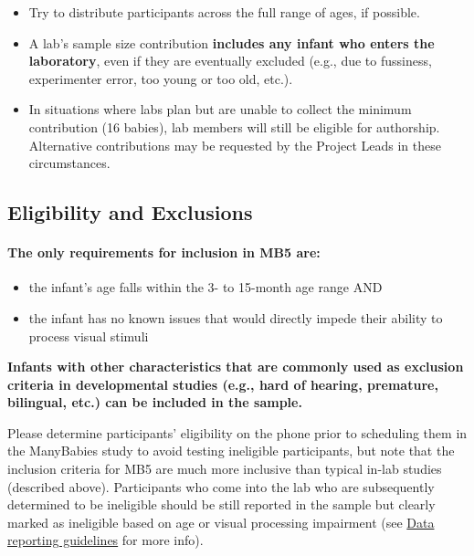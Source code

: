 \documentclass[
]{book}
\providecommand{\tightlist}{%
  \setlength{\itemsep}{0pt}\setlength{\parskip}{0pt}}
\begin{document}
\begin{itemize}
\tightlist
\item
  Try to distribute participants across the full range of ages, if possible.
\item
  A lab's sample size contribution \textbf{includes any infant who enters the laboratory}, even if they are eventually excluded (e.g., due to fussiness, experimenter error, too young or too old, etc.).
\item
  In situations where labs plan but are unable to collect the minimum contribution (16 babies), lab members will still be eligible for authorship. Alternative contributions may be requested by the Project Leads in these circumstances.
\end{itemize}

\subsection{Eligibility and Exclusions}\label{eligibility-and-exclusions}

\paragraph*{\texorpdfstring{The \textbf{only} requirements for inclusion in MB5 are:}{The only requirements for inclusion in MB5 are:}}\label{the-only-requirements-for-inclusion-in-mb5-are}

\begin{itemize}
\tightlist
\item
  the infant's age falls within the 3- to 15-month age range AND
\item
  the infant has no known issues that would directly impede their ability to process visual stimuli
\end{itemize}

\textbf{Infants with other characteristics that are commonly used as exclusion criteria in developmental studies (e.g., hard of hearing, premature, bilingual, etc.) can be included in the sample.}

Please determine participants' eligibility on the phone prior to scheduling them in the ManyBabies study to avoid testing ineligible participants, but note that the inclusion criteria for MB5 are much more inclusive than typical in-lab studies (described above). Participants who come into the lab who are subsequently determined to be ineligible should be still reported in the sample but clearly marked as ineligible based on age or visual processing impairment (see \hyperref[data-reporting-guidelines]{Data reporting guidelines} for more info).
\end{document}
